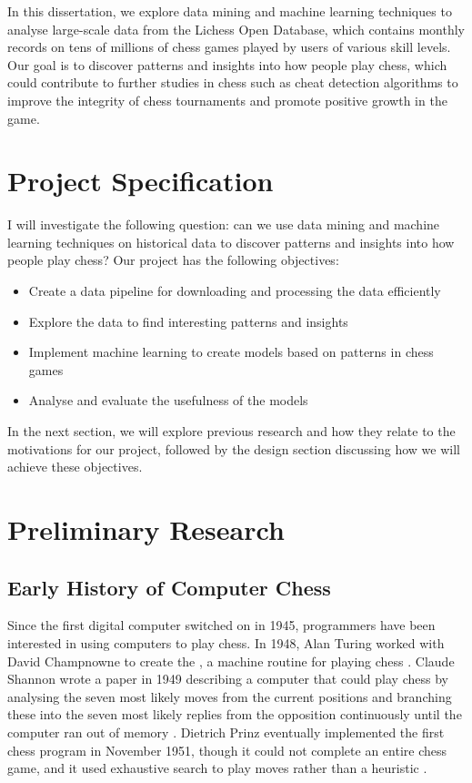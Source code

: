 \documentclass[a4paper, 11pt]{article}
\begin{document}
In this dissertation, we explore data mining and machine learning techniques to analyse large-scale data from the Lichess Open Database, which contains monthly records on tens of millions of chess games played by users of various skill levels. Our goal is to discover patterns and insights into how people play chess, which could contribute to further studies in chess such as cheat detection algorithms to improve the integrity of chess tournaments and promote positive growth in the game.

\section{Project Specification}
I will investigate the following question: can we use data mining and machine learning techniques on historical data to discover patterns and insights into how people play chess? Our project has the following objectives:

\begin{itemize}
    \setlength\itemsep{0em}
    \item Create a data pipeline for downloading and processing the data efficiently
    \item Explore the data to find interesting patterns and insights
    \item Implement machine learning to create models based on patterns in chess games
    \item Analyse and evaluate the usefulness of the models
\end{itemize}

In the next section, we will explore previous research and how they relate to the motivations for our project, followed by the design section discussing how we will achieve these objectives.

\section{Preliminary Research}

\subsection{Early History of Computer Chess}
Since the first digital computer switched on in 1945, programmers have been interested in using computers to play chess. In 1948, Alan Turing worked with David Champnowne to create the , a machine routine for playing chess \cite{copeland2005turing}. Claude Shannon wrote a paper in 1949 describing a computer that could play chess by analysing the seven most likely moves from the current positions and branching these into the seven most likely replies from the opposition continuously until the computer ran out of memory \cite{shannon1950xxii}. Dietrich Prinz eventually implemented the first chess program in November 1951, though it could not complete an entire chess game, and it used exhaustive search to play moves rather than a heuristic \cite{copeland2005turing}.
\end{document}
